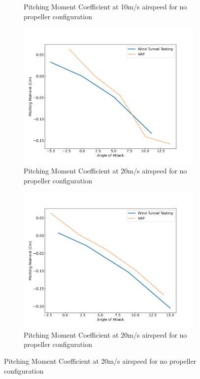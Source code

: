 \begin{figure}[H]
\begin{subfigure}[b]{0.467\textwidth}
        \caption{Pitching Moment Coefficient at 10m/s airspeed for no propeller configuration}
        \label{fig:VAP_NoProp_Cm_10ms_11000}
    \end{subfigure}
    \begin{subfigure}[b]{0.467\textwidth}
        \centering
        \includegraphics[width=\textwidth]{05_Results/VAP/noProp/Cm/20ms_6000RPM_Cm.png}
        \caption{Pitching Moment Coefficient at 20m/s airspeed for no propeller configuration}
        \label{fig:VAP_NoProp_Cm_20ms_6000}
    \end{subfigure}
    \begin{subfigure}[b]{0.467\textwidth}
        \centering
        \includegraphics[width=\textwidth]{05_Results/VAP/noProp/Cm/20ms_11000RPM_Cm.png}
        \caption{Pitching Moment Coefficient at 20m/s airspeed for no propeller configuration}
        \label{fig:VAP_NoProp_Cm_20ms_11000}
    \end{subfigure}
\end{figure}

